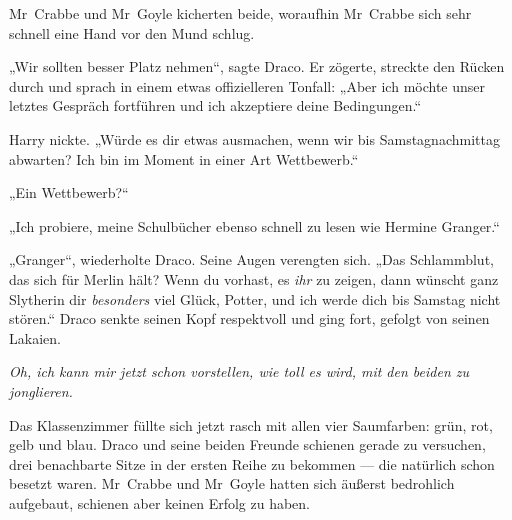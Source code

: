 Mr~Crabbe und Mr~Goyle kicherten beide, woraufhin Mr~Crabbe sich sehr schnell eine Hand vor den Mund schlug.

„Wir sollten besser Platz nehmen“, sagte Draco. Er zögerte, streckte den Rücken durch und sprach in einem etwas offizielleren Tonfall:
„Aber ich möchte unser letztes Gespräch fortführen und ich akzeptiere deine Bedingungen.“

Harry nickte.
„Würde es dir etwas ausmachen, wenn wir bis Samstagnachmittag abwarten? Ich bin im Moment in einer Art Wettbewerb.“

„Ein Wettbewerb?“

„Ich probiere, meine Schulbücher ebenso schnell zu lesen wie Hermine Granger.“

„Granger“, wiederholte Draco. Seine Augen verengten sich.
„Das Schlammblut, das sich für Merlin hält? Wenn du vorhast, es \emph{ihr} zu zeigen, dann wünscht ganz Slytherin dir \emph{besonders} viel Glück, Potter, und ich werde dich bis Samstag nicht stören.“ Draco senkte seinen Kopf respektvoll und ging fort, gefolgt von seinen Lakaien.

\emph{Oh, ich kann mir jetzt schon vorstellen, wie toll es wird, mit den beiden zu jonglieren.}

Das Klassenzimmer füllte sich jetzt rasch mit allen vier Saumfarben: grün, rot, gelb und blau. Draco und seine beiden Freunde schienen gerade zu versuchen, drei benachbarte Sitze in der ersten Reihe zu bekommen — die natürlich schon besetzt waren. Mr~Crabbe und Mr~Goyle hatten sich äußerst bedrohlich aufgebaut, schienen aber keinen Erfolg zu haben.

